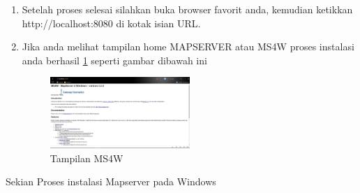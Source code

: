\begin{enumerate}
\begin{figure}[ht]
		\end{figure}
\item
Setelah proses selesai silahkan buka browser favorit anda, kemudian ketikkan http://localhost:8080 di kotak isian URL.
\item
Jika anda melihat tampilan home MAPSERVER atau MS4W proses instalasi anda berhasil \ref{gambar4} seperti gambar dibawah ini
\begin{figure}[ht]
	    \centerline{\includegraphics[width=0.50\textwidth]{figures/gambar4.JPG}}
	    \caption{Tampilan MS4W}
		\label{gambar4}
		\end{figure}
\end{enumerate}
Sekian Proses instalasi Mapserver pada Windows
